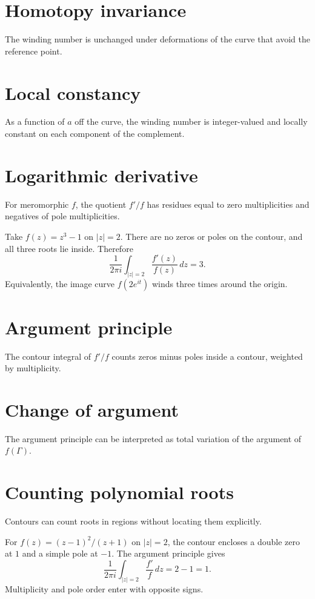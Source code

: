 \section{Homotopy invariance}
The winding number is unchanged under deformations of the curve that avoid the reference point.

\section{Local constancy}
As a function of $a$ off the curve, the winding number is integer-valued and locally constant on each component of the complement.

\section{Logarithmic derivative}
For meromorphic $f$, the quotient $f'/f$ has residues equal to zero multiplicities and negatives of pole multiplicities.

\begin{example}\label{ex:iv12-expand-02}
Take \(f(z)=z^3-1\) on \(|z|=2\). There are no zeros or poles on the contour, and all three roots lie inside. Therefore
\[
\frac{1}{2\pi i}\int_{|z|=2}\frac{f'(z)}{f(z)}\,dz=3.
\]
Equivalently, the image curve \(f(2e^{it})\) winds three times around the origin.
\end{example}
\section{Argument principle}
The contour integral of $f'/f$ counts zeros minus poles inside a contour, weighted by multiplicity.

\section{Change of argument}
The argument principle can be interpreted as total variation of the argument of $f(\Gamma)$.

\section{Counting polynomial roots}
Contours can count roots in regions without locating them explicitly.

\begin{example}\label{ex:iv12-expand-03}
For \(f(z)=(z-1)^2/(z+1)\) on \(|z|=2\), the contour encloses a double zero at \(1\) and a simple pole at \(-1\). The argument principle gives
\[
\frac{1}{2\pi i}\int_{|z|=2}\frac{f'}{f}\,dz=2-1=1.
\]
Multiplicity and pole order enter with opposite signs.
\end{example}
